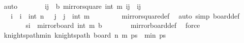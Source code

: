 \begin{isabellebody}
\ auto\isanewline
\ \ \ \ \isamarkupfalse%
\ \isamarkupfalse%
\ {\isachardoublequoteopen}{\isacharparenleft}{\kern0pt}i{\isacharprime}{\kern0pt}{\isacharcomma}{\kern0pt}j{\isacharprime}{\kern0pt}{\isacharparenright}{\kern0pt}\ {\isasymin}\ {\isacharquery}{\kern0pt}b{\isachardoublequoteclose}\ {\isachardoublequoteopen}mirror{}{\isacharunderscore}{\kern0pt}square\ {\isacharparenleft}{\kern0pt}int\ m{\isacharplus}{\kern0pt}{}{\isacharparenright}{\kern0pt}\ {\isacharparenleft}{\kern0pt}i{\isacharprime}{\kern0pt}{\isacharcomma}{\kern0pt}j{\isacharprime}{\kern0pt}{\isacharparenright}{\kern0pt}\ {\isacharequal}{\kern0pt}\ {\isacharparenleft}{\kern0pt}i{\isacharcomma}{\kern0pt}j{\isacharparenright}{\kern0pt}{\isachardoublequoteclose}\ \isanewline
\ \ \ \ \ \ \isamarkupfalse%
\ {\isacartoucheopen}{}\ {\isasymle}\ i\ {\isasymand}\ i\ {\isasymle}\ int\ n{\isacartoucheclose}\ {\isacartoucheopen}{}\ {\isasymle}\ j\ {\isasymand}\ j\ {\isasymle}\ int\ m{\isacartoucheclose}\ \isanewline
\ \ \ \ \ \ \isamarkupfalse%
\ mirror{}{\isacharunderscore}{\kern0pt}square{\isacharunderscore}{\kern0pt}def\ \isamarkupfalse%
\ {\isacharparenleft}{\kern0pt}auto\ simp{\isacharcolon}{\kern0pt}\ board{\isacharunderscore}{\kern0pt}def{\isacharparenright}{\kern0pt}\isanewline
\ \ \ \ \isamarkupfalse%
\ \isamarkupfalse%
\ {\isachardoublequoteopen}s\isactrlsub i\ {\isasymin}\ mirror{}{\isacharunderscore}{\kern0pt}board\ {\isacharparenleft}{\kern0pt}int\ m{\isacharplus}{\kern0pt}{}{\isacharparenright}{\kern0pt}\ {\isacharquery}{\kern0pt}b{\isachardoublequoteclose}\isanewline
\ \ \ \ \ \ \isamarkupfalse%
\ mirror{}{\isacharunderscore}{\kern0pt}board{\isacharunderscore}{\kern0pt}def\ \isamarkupfalse%
\ force\isanewline
\ \ \isamarkupfalse%
\isanewline
{}\isamarkupfalse%
%
\endisatagproof
{\isafoldproof}%
%
\isadelimproof
\isanewline
%
\endisadelimproof
\isanewline
{}\isamarkupfalse%
\ knights{\isacharunderscore}{\kern0pt}path{\isacharunderscore}{\kern0pt}min{}{\isacharcolon}{\kern0pt}\ {\isachardoublequoteopen}knights{\isacharunderscore}{\kern0pt}path\ {\isacharparenleft}{\kern0pt}board\ n\ m{\isacharparenright}{\kern0pt}\ ps\ {\isasymLongrightarrow}\ min{}\ ps\ {\isacharequal}{\kern0pt}\ {}{\isachardoublequoteclose}\isanewline
%
\isadelimproof
%
\endisadelimproof

\end{isabellebody}
